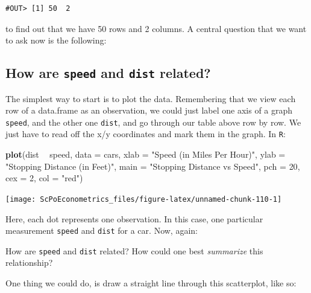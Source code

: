 \documentclass[]{book}
\newenvironment{Shaded}{\begin{snugshade}}{\end{snugshade}}
\newcommand{\DataTypeTok}[1]{\textcolor[rgb]{0.13,0.29,0.53}{#1}}
\newcommand{\DecValTok}[1]{\textcolor[rgb]{0.00,0.00,0.81}{#1}}
\newcommand{\KeywordTok}[1]{\textcolor[rgb]{0.13,0.29,0.53}{\textbf{#1}}}
\newcommand{\NormalTok}[1]{#1}
\newcommand{\OperatorTok}[1]{\textcolor[rgb]{0.81,0.36,0.00}{\textbf{#1}}}
\newcommand{\StringTok}[1]{\textcolor[rgb]{0.31,0.60,0.02}{#1}}
\newenvironment{note}{\begin{tcolorbox}[colback=blue!5!white,colframe=blue!75!black]}{\end{tcolorbox}}
\begin{document}
\begin{verbatim}
#OUT> [1] 50  2
\end{verbatim}

to find out that we have 50 rows and 2 columns. A central question that we want to ask now is the following:

\hypertarget{how-are-speed-and-dist-related}{%
\subsection{\texorpdfstring{How are \texttt{speed} and \texttt{dist} related?}{How are speed and dist related?}}\label{how-are-speed-and-dist-related}}

The simplest way to start is to plot the data. Remembering that we view each row of a data.frame as an observation, we could just label one axis of a graph \texttt{speed}, and the other one \texttt{dist}, and go through our table above row by row. We just have to read off the x/y coordinates and mark them in the graph. In \texttt{R}:

\begin{Shaded}
\begin{Highlighting}[]
\KeywordTok{plot}\NormalTok{(dist }\OperatorTok{~}\StringTok{ }\NormalTok{speed, }\DataTypeTok{data =}\NormalTok{ cars,}
     \DataTypeTok{xlab =} \StringTok{"Speed (in Miles Per Hour)"}\NormalTok{,}
     \DataTypeTok{ylab =} \StringTok{"Stopping Distance (in Feet)"}\NormalTok{,}
     \DataTypeTok{main =} \StringTok{"Stopping Distance vs Speed"}\NormalTok{,}
     \DataTypeTok{pch  =} \DecValTok{20}\NormalTok{,}
     \DataTypeTok{cex  =} \DecValTok{2}\NormalTok{,}
     \DataTypeTok{col  =} \StringTok{"red"}\NormalTok{)}
\end{Highlighting}
\end{Shaded}

\begin{center}\texttt{[image: ScPoEconometrics\_files/figure-latex/unnamed-chunk-110-1]} \end{center}

Here, each dot represents one observation. In this case, one particular measurement \texttt{speed} and \texttt{dist} for a car. Now, again:

\begin{note}
How are \texttt{speed} and \texttt{dist} related? How could one best
\emph{summarize} this relationship?
\end{note}

One thing we could do, is draw a straight line through this scatterplot, like so:
\end{document}
